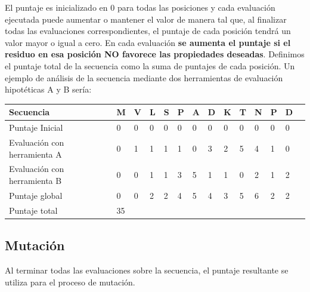 El puntaje es inicializado en 0 para todas las posiciones y cada evaluación ejecutada puede aumentar o mantener el valor de manera tal que, 
al finalizar todas las evaluaciones correspondientes, el puntaje de cada posición tendrá un valor mayor o igual a cero.
En cada evaluación \textbf{se aumenta el puntaje si el residuo en esa posición NO favorece las propiedades deseadas}.
Definimos el puntaje total de la secuencia como la suma de puntajes de cada posición.
Un ejemplo de análisis de la secuencia mediante dos herramientas de evaluación hipotéticas A y B sería: %

\vspace{0.3cm}
\begin{center}
\begin{tabular}{llllllllllllll} 
\hline
Secuencia & \textbf{M} & \textbf{V} & \textbf{L} & \textbf{S} & \textbf{P} & \textbf{A} & \textbf{D} & \textbf{K} & \textbf{T} & \textbf{N} & \textbf{P} & \textbf{D} \\ \hline
Puntaje Inicial & 0 & 0 & 0 & 0 & 0 & 0 & 0 & 0 & 0 & 0 & 0 & 0\\ \hline
Evaluación con herramienta A & 0 & 1 & 1 & 1 & 1 & 0 & 3 & 2 & 5 & 4 & 1 & 0\\ \hline
Evaluación con herramienta B & 0 & 0 & 1 & 1 & 3 & 5 & 1 & 1 & 0 & 2 & 1 & 2\\ \hline
Puntaje global & 0 & 0 & 2 & 2 & 4 & 5 & 4 & 3 & 5 & 6 & 2 & 2\\ \hline
Puntaje total  & 35 \\ \hline
\end{tabular}
\end{center}

\vspace{0.5cm}



\subsection{Mutación}\label{mutacion}

Al terminar todas las evaluaciones sobre la secuencia, el puntaje resultante se utiliza para el proceso de mutación.



